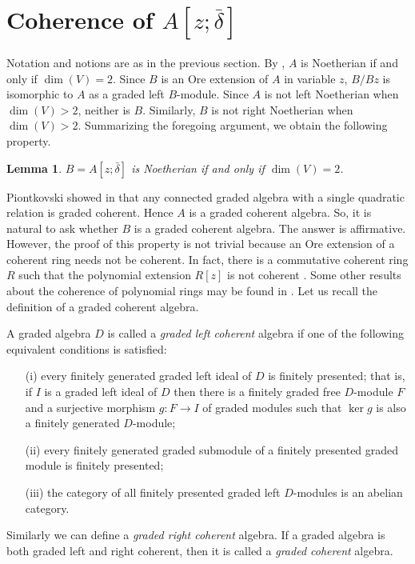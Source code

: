 \documentclass[a4paper]{amsart}
\newtheorem{lem}[thm]{Lemma}
\begin{document}
\section{Coherence of $A[z;\bar{\delta}]$}

Notation and notions are as in the previous section. By \cite[Theorem 0.2]{Z}, $A$ is Noetherian if and only if $\dim (V)=2$. Since $B$ is an Ore extension of $A$ in variable $z$, $B/Bz$ is isomorphic to $A$ as a graded left $B$-module. Since $A$ is not left Noetherian when $\dim (V)>2$, neither is $B$. Similarly, $B$ is not right Noetherian when $\dim(V)>2$. Summarizing the foregoing argument, we obtain the following property.

\begin{lem} $B=A[z;\bar{\delta}]$ is Noetherian if and only if $\dim (V)=2$.
\end{lem}

Piontkovski showed in \cite[Theorem 4.1]{Pi} that any connected graded algebra with a single quadratic relation is graded coherent. Hence $A$ is a graded coherent algebra. So, it is natural to ask whether $B$ is a graded coherent algebra. The answer is affirmative. However, the proof of this property is not trivial because an Ore extension of a coherent ring needs not be coherent. In fact, there is a commutative coherent ring $R$ such that the polynomial extension $R[z]$ is not coherent \cite{So}. Some other results about the coherence of polynomial rings may be found in \cite{GV}. Let us recall the definition of a graded coherent algebra.

A graded algebra $D$ is called a {\it graded left coherent} algebra if one of the following equivalent conditions is satisfied:
\begin{itemize}
  \item [(i)] every finitely generated graded left ideal of $D$ is finitely presented; that is, if $I$ is a graded left ideal of $D$ then there is a finitely graded free $D$-module $F$ and a surjective morphism $g:F\to I$ of graded modules such that $\ker g$ is also a finitely generated $D$-module;
  \item[(ii)] every finitely generated graded submodule of a finitely presented graded module is finitely presented;
  \item [(iii)] the category of all finitely presented graded left $D$-modules is an abelian category.
\end{itemize}
Similarly we can define a {\it graded right coherent} algebra. If a graded algebra is both graded left and right coherent, then it is called a {\it graded coherent} algebra.
\end{document}
